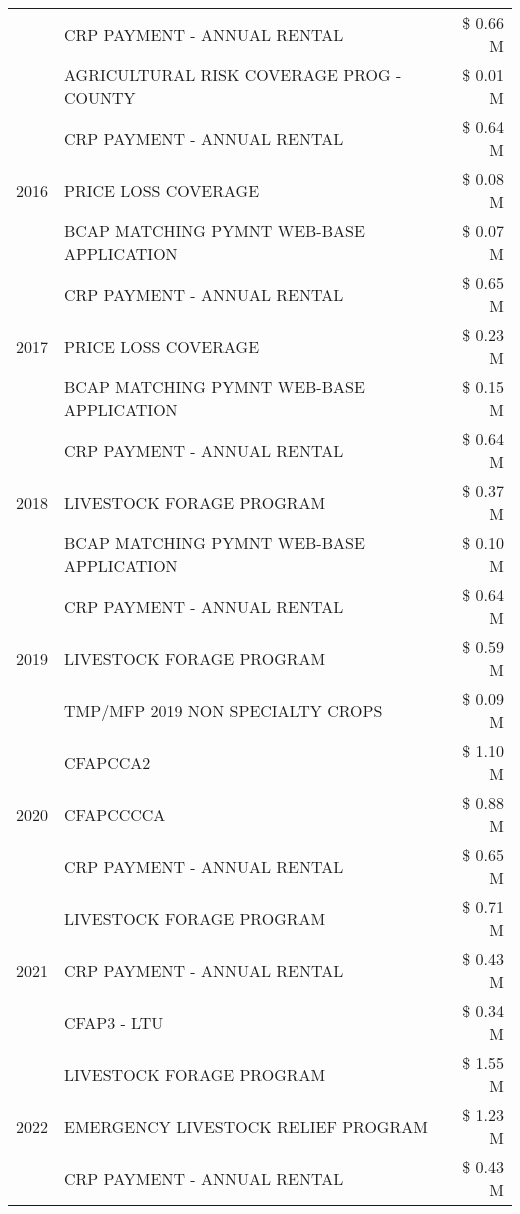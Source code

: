 \begin{tabular}{llr}
 & CRP PAYMENT - ANNUAL RENTAL & \$ 0.66 M \\
 & AGRICULTURAL RISK COVERAGE PROG - COUNTY & \$ 0.01 M \\
\cline{1-3}
\multirow[t]{3}{*}{2016} & CRP PAYMENT - ANNUAL RENTAL & \$ 0.64 M \\
 & PRICE LOSS COVERAGE & \$ 0.08 M \\
 & BCAP MATCHING PYMNT WEB-BASE APPLICATION & \$ 0.07 M \\
\cline{1-3}
\multirow[t]{3}{*}{2017} & CRP PAYMENT - ANNUAL RENTAL & \$ 0.65 M \\
 & PRICE LOSS COVERAGE & \$ 0.23 M \\
 & BCAP MATCHING PYMNT WEB-BASE APPLICATION & \$ 0.15 M \\
\cline{1-3}
\multirow[t]{3}{*}{2018} & CRP PAYMENT - ANNUAL RENTAL & \$ 0.64 M \\
 & LIVESTOCK FORAGE PROGRAM & \$ 0.37 M \\
 & BCAP MATCHING PYMNT WEB-BASE APPLICATION & \$ 0.10 M \\
\cline{1-3}
\multirow[t]{3}{*}{2019} & CRP PAYMENT - ANNUAL RENTAL & \$ 0.64 M \\
 & LIVESTOCK FORAGE PROGRAM & \$ 0.59 M \\
 & TMP/MFP 2019 NON SPECIALTY CROPS & \$ 0.09 M \\
\cline{1-3}
\multirow[t]{3}{*}{2020} & CFAPCCA2 & \$ 1.10 M \\
 & CFAPCCCCA & \$ 0.88 M \\
 & CRP PAYMENT - ANNUAL RENTAL & \$ 0.65 M \\
\cline{1-3}
\multirow[t]{3}{*}{2021} & LIVESTOCK FORAGE PROGRAM & \$ 0.71 M \\
 & CRP PAYMENT - ANNUAL RENTAL & \$ 0.43 M \\
 & CFAP3 - LTU & \$ 0.34 M \\
\cline{1-3}
\multirow[t]{3}{*}{2022} & LIVESTOCK FORAGE PROGRAM & \$ 1.55 M \\
 & EMERGENCY LIVESTOCK RELIEF PROGRAM & \$ 1.23 M \\
 & CRP PAYMENT - ANNUAL RENTAL & \$ 0.43 M \\
\cline{1-3}
\bottomrule
\end{tabular}
